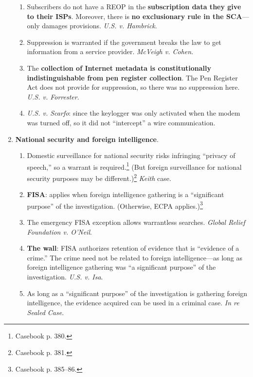 \begin{enumerate}
\begin{enumerate}
        \item Subscribers do not have a REOP in the \textbf{subscription data 
        they give to their ISPs}. Moreover, there is \textbf{no exclusionary 
        rule in the SCA}---only damages provisions. \emph{U.S. v. Hambrick}.
        \item Suppression is warranted if the government breaks the law to get 
        information from a service provider. \emph{McVeigh v. Cohen}.
        \item The \textbf{collection of Internet metadata is constitutionally 
        indistinguishable from pen register collection}. The Pen Register Act 
        does not provide for suppression, so there was no suppression here. 
        \emph{U.S. v. Forrester}.
        \item \emph{U.S. v. Scarfo}: since the keylogger was only activated 
        when the modem was turned off, so it did not ``intercept'' a wire 
        communication.
    \end{enumerate}
    \item \textbf{National security and foreign intelligence}.
    \begin{enumerate}
        \item Domestic surveillance for national security risks infringing 
        ``privacy of speech,'' so a warrant is required.\footnote{Casebook p.  
        380.} (But foreign surveillance for national security purposes may be 
        different.)\footnote{Casebook p. 381.} \emph{Keith} case.
        \item \textbf{FISA}: applies when foreign intelligence gathering is a 
        ``significant purpose'' of the investigation. (Otherwise, ECPA 
        applies.)\footnote{Casebook p. 385--86.}
        \item The emergency FISA exception allows warrantless searches. 
        \emph{Global Relief Foundation v. O'Neil}.
        \item \textbf{The wall}: FISA authorizes retention of evidence that is 
        ``evidence of a crime.'' The crime need not be related to foreign 
        intelligence---as long as foreign intelligence gathering was ``a 
        significant purpose'' of the investigation. \emph{U.S. v. Isa}.
        \item As long as a ``significant purpose'' of the investigation is 
        gathering foreign intelligence, the evidence acquired can be used in a 
        criminal case. \emph{In re Sealed Case}.
    \end{enumerate}
\end{enumerate}

